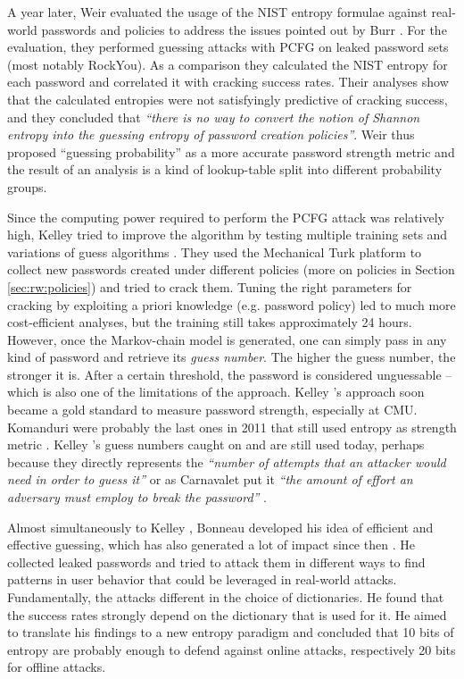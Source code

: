 	A year later, Weir \etal evaluated the usage of the \gls{NIST} entropy formulae against real-world passwords and policies \cite{Weir2010MetricsPolicies} to address the issues pointed out by Burr \etal. For the evaluation, they performed guessing attacks with PCFG on leaked password sets (most notably RockYou). As a comparison they calculated the NIST entropy for each password and correlated it with cracking success rates. Their analyses show that the calculated entropies were not satisfyingly predictive of cracking success, and they concluded that \textit{``there is no way to convert the notion of Shannon entropy into the guessing entropy of password creation
	policies''}. Weir \etal thus proposed ``guessing probability'' as a more accurate password strength metric and the result of an analysis is a kind of lookup-table split into different probability groups. 

	Since the computing power required to perform the PCFG attack was relatively high, Kelley \etal tried to improve the algorithm by testing multiple training sets and variations of guess algorithms \cite{Kelley2012GuessAgain}. They used the Mechanical Turk platform to collect new passwords created under different policies (more on policies in Section \ref{sec:rw:policies}) and tried to crack them. Tuning the right parameters for cracking by exploiting a priori knowledge (e.g. password policy) led to much more cost-efficient analyses, but the training still takes approximately 24 hours. However, once the Markov-chain model is generated, one can simply pass in any kind of password and retrieve its \textit{guess number}. The higher the guess number, the stronger it is. After a certain threshold, the password is considered unguessable -- which is also one of the limitations of the approach. Kelley \etal's approach soon became a gold standard to measure password strength, especially at CMU. Komanduri \etal were probably the last ones in 2011 that still used entropy as strength metric \cite{Komanduri2011OfPasswordsAndPeople}. Kelley \etal's guess numbers caught on and are still used today, perhaps because they directly represents the \textit{``number of attempts that an attacker would need in order to guess it''} \cite{Dellamico2015MonteCarlo} or as Carnavalet put it \textit{``the amount of effort an adversary must employ to break the password''} \cite{Carnavalet2014AnalyzingPWStrengthMeters}.
	
	Almost simultaneously to Kelley \etal, Bonneau developed his idea of efficient and effective guessing, which has also generated a lot of impact since then \cite{Bonneau2012ScienceOfGuessing}. He collected leaked passwords and tried to attack them in different ways to find patterns in user behavior that could be leveraged in real-world attacks. Fundamentally, the attacks different in the choice of dictionaries. He found that the success rates strongly depend on the dictionary that is used for it. He aimed to translate his findings to a new entropy paradigm and concluded that 10 bits of entropy are probably enough to defend against online attacks, respectively 20 bits for offline attacks. 
	
